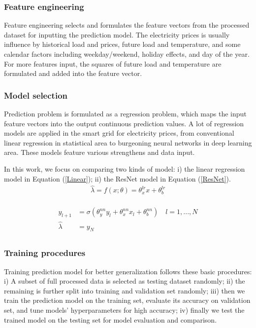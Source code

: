 \documentclass[journal]{IEEEtran}
\begin{document}
\subsubsection{Feature engineering}
Feature engineering selects and formulates the feature vectors from the processed dataset for inputting the prediction model. The electricity prices is usually influence by historical load and prices, future load and temperature, and some calendar factors including weekday/weekend, holiday effects, and day of the year. For more features input, the squares of future load and temperature are formulated and added into the feature vector.

\subsubsection{Model selection}
Prediction problem is formulated as a regression problem, which maps the input feature vectors into the output continuous prediction values. A lot of regression models are applied in the smart grid for electricity prices, from conventional linear regression in statistical area to burgeoning neural networks in deep learning area. These models feature various strengthens and data input. 

In this work, we focus on comparing two kinds of model: i) the linear regression model in Equation (\ref{Linear}); ii) the ResNet model in Equation (\ref{ResNet}). 
\begin{equation}
  \label{Linear}
  \begin{aligned}
    \hat{\lambda} = f(x; \theta) = \theta_x^{lr} x + \theta_b^{lr} \\ 
  \end{aligned}
\end{equation}

\begin{equation}
  \label{ResNet}
  \begin{aligned}
     y_{l+1} &= \sigma (\theta_y^{nn} y_l + \theta_x^{nn} x_l + \theta_b^{nn}) \quad l = 1, ..., N \\
     \hat{\lambda} &= y_{N} \\
  \end{aligned}
\end{equation}

\subsubsection{Training procedures}
Training prediction model for better generalization follows these basic procedures: i) A subset of full processed data is selected as testing dataset randomly; ii) the remaining is further split into training and validation set randomly; iii) then we train the prediction model on the training set, evaluate its accuracy on validation set, and tune models' hyperparameters for high accuracy; iv) finally we test the trained model on the testing set for model evaluation and comparison. 
\end{document}
